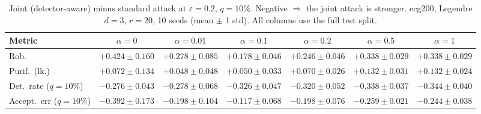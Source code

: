 \begin{table}[htbp]
  \centering
  \small
  \begin{tabular}{@{}lcccccc@{}}
    \toprule
    Metric & $\alpha{=}0$ & $\alpha{=}0.01$ & $\alpha{=}0.1$ & $\alpha{=}0.2$ & $\alpha{=}0.5$ & $\alpha{=}1$ \\
    \midrule
    Rob. & $+0.424 \pm 0.160$ & $+0.278 \pm 0.085$ & $+0.178 \pm 0.046$ & $+0.246 \pm 0.046$ & $+0.338 \pm 0.029$ & $+0.338 \pm 0.029$ \\
    Purif.\ (lk.) & $+0.072 \pm 0.134$ & $+0.048 \pm 0.048$ & $+0.050 \pm 0.033$ & $+0.070 \pm 0.026$ & $+0.132 \pm 0.031$ & $+0.132 \pm 0.024$ \\
    Det.\ rate ($q{=}10\%$) & $-0.276 \pm 0.043$ & $-0.278 \pm 0.068$ & $-0.326 \pm 0.047$ & $-0.320 \pm 0.052$ & $-0.338 \pm 0.037$ & $-0.344 \pm 0.040$ \\
    Accept.\ err ($q{=}10\%$) & $-0.392 \pm 0.173$ & $-0.198 \pm 0.104$ & $-0.117 \pm 0.068$ & $-0.198 \pm 0.076$ & $-0.259 \pm 0.021$ & $-0.244 \pm 0.038$ \\
    \bottomrule
  \end{tabular}
  \caption{Joint (detector-aware) minus standard attack at $\varepsilon=0.2$, $q{=}10\%$. Negative $\Rightarrow$ the joint attack is stronger. ecg200, Legendre $d{=}3$, $r{=}20$, 10 seeds (mean $\pm$ 1 std). All columns use the full test split.}
  \label{tab:ecg200_joint_r20_eps0.2}
\end{table}
